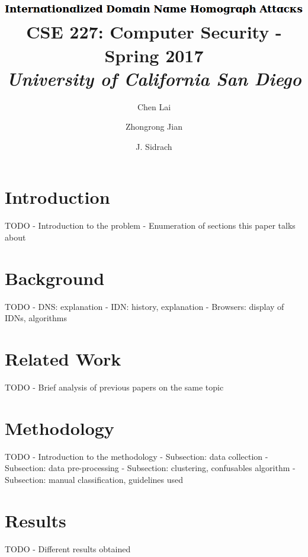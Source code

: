 \documentclass[letterpaper,twocolumn,10pt]{article}
\begin{document}
\date{}

\title{\Large
\includegraphics[height=\baselineskip]{title}
\\ \vspace{0.025 in} \large \normalfont
CSE 227: Computer Security - Spring 2017 \\ \textit{
University of California San Diego
}}

\author{
{\rm Chen Lai}\\
\and
{\rm Zhongrong Jian}\\
\and
{\rm J. Sidrach}\\
}

\maketitle


\section{Introduction}
TODO
- Introduction to the problem
- Enumeration of sections this paper talks about

\section{Background}
TODO
- DNS: explanation
- IDN: history, explanation
- Browsers: display of IDNs, algorithms

\section{Related Work}
TODO
- Brief analysis of previous papers on the same topic

\section{Methodology}
TODO
- Introduction to the methodology
- Subsection: data collection
- Subsection: data pre-processing
- Subsection: clustering, confusables algorithm
- Subsection: manual classification, guidelines used

\section{Results}
TODO
- Different results obtained
\end{document}
